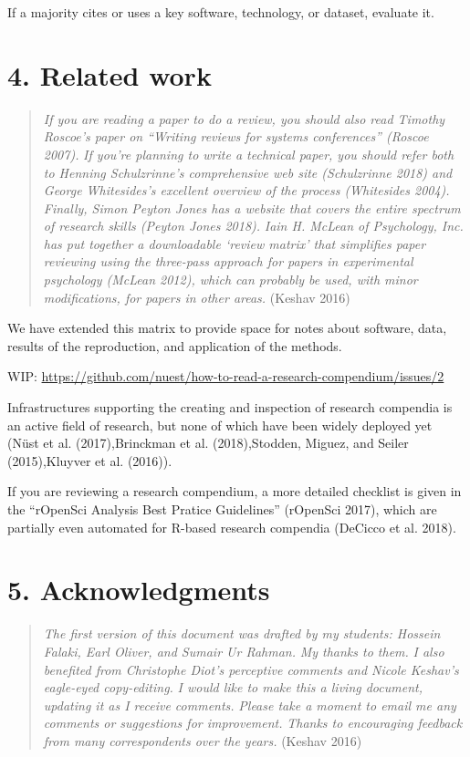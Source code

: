 \documentclass[fleqn,10pt]{wlpeerj} %
\begin{document}
If a majority cites or uses a key software, technology, or dataset,
evaluate it.

\section*{4. Related work}\label{related-work}

\begin{quote}
\emph{If you are reading a paper to do a review, you should also read
Timothy Roscoe's paper on ``Writing reviews for systems conferences''
(Roscoe 2007).} \emph{If you're planning to write a technical paper, you
should refer both to Henning Schulzrinne's comprehensive web site
(Schulzrinne 2018) and George Whitesides's excellent overview of the
process (Whitesides 2004).} \emph{Finally, Simon Peyton Jones has a
website that covers the entire spectrum of research skills (Peyton Jones
2018).} \emph{Iain H. McLean of Psychology, Inc. has put together a
downloadable `review matrix' that simplifies paper reviewing using the
three-pass approach for papers in experimental psychology (McLean 2012),
which can probably be used, with minor modifications, for papers in
other areas.} (Keshav 2016)
\end{quote}

We have extended this matrix to provide space for notes about software,
data, results of the reproduction, and application of the methods.

WIP:
\url{https://github.com/nuest/how-to-read-a-research-compendium/issues/2}

Infrastructures supporting the creating and inspection of research
compendia is an active field of research, but none of which have been
widely deployed yet (Nüst et al. (2017),Brinckman et al. (2018),Stodden,
Miguez, and Seiler (2015),Kluyver et al. (2016)).

If you are reviewing a research compendium, a more detailed checklist is
given in the ``rOpenSci Analysis Best Pratice Guidelines'' (rOpenSci
2017), which are partially even automated for R-based research compendia
(DeCicco et al. 2018).

\section*{5. Acknowledgments}\label{acknowledgments}

\begin{quote}
\emph{The first version of this document was drafted by my students:
Hossein Falaki, Earl Oliver, and Sumair Ur Rahman.} \emph{My thanks to
them.} \emph{I also benefited from Christophe Diot's perceptive comments
and Nicole Keshav's eagle-eyed copy-editing.} \emph{I would like to make
this a living document, updating it as I receive comments.} \emph{Please
take a moment to email me any comments or suggestions for improvement.}
\emph{Thanks to encouraging feedback from many correspondents over the
years.} (Keshav 2016)
\end{quote}
\end{document}
